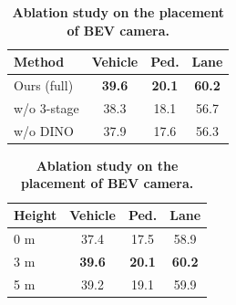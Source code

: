 \begin{table}[t]
\centering
\small

\begin{minipage}[t]{0.48\linewidth}
\centering
\caption{\textbf{Ablation study on different modules and designs.}}
\label{tab:ablation_module}
\vspace{-0.5em}
{\setlength{\tabcolsep}{5pt}

\begin{tabular}{lccc}
\toprule
\textbf{Method} & \textbf{Vehicle} & \textbf{Ped.} & \textbf{Lane} \\
\midrule
Ours (full) & \textbf{39.6} & \textbf{20.1} & \textbf{60.2} \\
w/o 3-stage & 38.3 & 18.1 & 56.7 \\
w/o DINO & 37.9 & 17.6 & 56.3 \\
\bottomrule
\end{tabular}}
\end{minipage}
\hfill
\begin{minipage}[t]{0.48\linewidth}
\centering
\caption{\textbf{Ablation study on the placement of BEV camera.}}
\label{tab:ablation_height}
\vspace{-0.5em}
{\setlength{\tabcolsep}{5pt}
\begin{tabular}{lccc}
\toprule
\textbf{Height} & 
\textbf{Vehicle} & 
\textbf{Ped. } & 
\textbf{Lane } \\
\midrule
0 m & 37.4 & 17.5 & 58.9 \\
3 m & \textbf{39.6} & \textbf{20.1} & \textbf{60.2} \\
5 m & 39.2 & 19.1 & 59.9 \\
\bottomrule
\end{tabular}}
\label{tab:height_ablation}
\end{minipage}

\end{table}